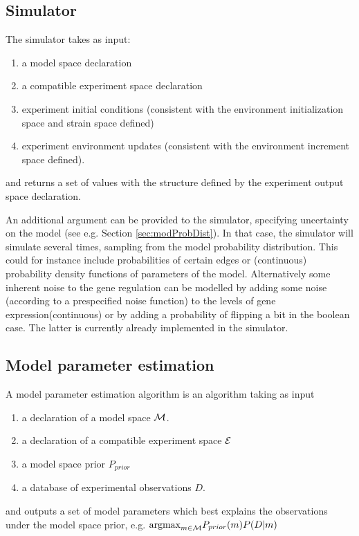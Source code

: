 \documentclass{article}
\begin{document}
\subsection{Simulator}
The simulator takes as input:
\begin{enumerate}
\item a model space declaration
\item a compatible experiment space declaration
\item experiment initial conditions (consistent with the environment initialization space and strain space defined)
\item experiment environment updates (consistent with the environment increment space defined).
\end{enumerate}

and returns a set of values with the structure defined by the experiment output space declaration.


An additional argument can be provided to the simulator, specifying uncertainty on the model (see e.g. Section \ref{sec:modProbDist}).  In that case, the simulator will simulate several times, sampling from the model probability distribution.  
This could for instance include probabilities of certain edges or (continuous) probability density functions of parameters of the model. Alternatively some inherent noise to the gene regulation can be modelled by adding some noise (according to a prespecified
noise function) to the levels of gene expression(continuous) or by adding a probability of flipping a bit in the boolean case. The latter is currently already implemented in the simulator.

\subsection{Model parameter estimation}

A model parameter estimation algorithm is an algorithm taking as input
\begin{enumerate}
\item a declaration of a model space $\mathcal{M}$.
\item a declaration of a compatible experiment space $\mathcal{E}$
\item a model space prior $P_{prior}$
\item a database of experimental observations $D$.
\end{enumerate}

and outputs a set of model parameters which best explains the observations under the model space prior, e.g.
$\hbox{argmax}_{m\in\mathcal{M}} P_{prior}(m)P(D|m)$
\end{document}
